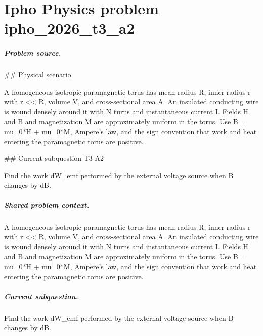 
\chapter{Ipho Physics problem ipho\_2026\_t3\_a2}
\label{ch:IPhO2026Problems_problem_ipho_2026_t3_a2}

\paragraph{Problem source.}
\#\# Physical scenario

A homogeneous isotropic paramagnetic torus has mean radius R, inner radius r
with r << R, volume V, and cross-sectional area A.  An insulated conducting
wire is wound densely around it with N turns and instantaneous current I.
Fields H and B and magnetization M are approximately uniform in the torus.
Use B = mu\_0*H + mu\_0*M, Ampere's law, and the sign convention that work and
heat entering the paramagnetic torus are positive.

\#\# Current subquestion T3-A2

Find the work dW\_emf performed by the external voltage source when B changes by dB.

\paragraph{Shared problem context.}
A homogeneous isotropic paramagnetic torus has mean radius R, inner radius r
with r << R, volume V, and cross-sectional area A.  An insulated conducting
wire is wound densely around it with N turns and instantaneous current I.
Fields H and B and magnetization M are approximately uniform in the torus.
Use B = mu\_0*H + mu\_0*M, Ampere's law, and the sign convention that work and
heat entering the paramagnetic torus are positive.

\paragraph{Current subquestion.}
Find the work dW\_emf performed by the external voltage source when B changes by dB.

